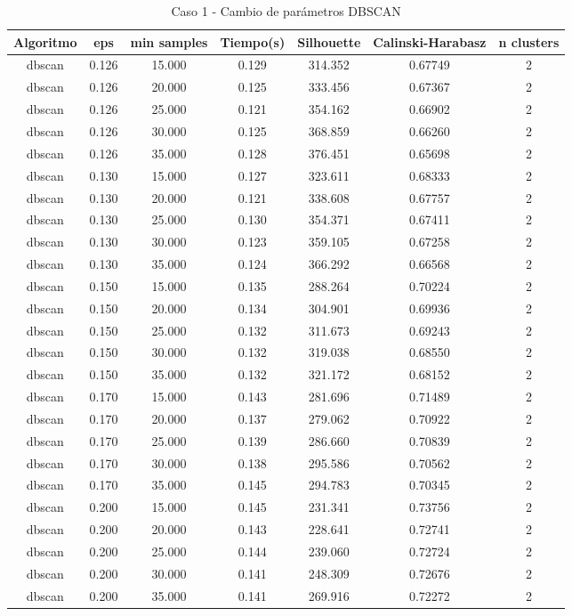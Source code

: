 \begin{table}[H]
\centering
\caption{Caso 1 - Cambio de parámetros DBSCAN}
\label{tab:c1_dbscan}
\begin{tabular}{ccccccc}
\toprule
Algoritmo & eps & min samples & Tiempo(s) & Silhouette & Calinski-Harabasz & n clusters \\
\midrule
dbscan & 0.126 & 15.000 & 0.129 & 314.352 & 0.67749 & 2 \\
dbscan & 0.126 & 20.000 & 0.125 & 333.456 & 0.67367 & 2 \\
dbscan & 0.126 & 25.000 & 0.121 & 354.162 & 0.66902 & 2 \\
dbscan & 0.126 & 30.000 & 0.125 & 368.859 & 0.66260 & 2 \\
dbscan & 0.126 & 35.000 & 0.128 & 376.451 & 0.65698 & 2 \\
dbscan & 0.130 & 15.000 & 0.127 & 323.611 & 0.68333 & 2 \\
dbscan & 0.130 & 20.000 & 0.121 & 338.608 & 0.67757 & 2 \\
dbscan & 0.130 & 25.000 & 0.130 & 354.371 & 0.67411 & 2 \\
dbscan & 0.130 & 30.000 & 0.123 & 359.105 & 0.67258 & 2 \\
dbscan & 0.130 & 35.000 & 0.124 & 366.292 & 0.66568 & 2 \\
dbscan & 0.150 & 15.000 & 0.135 & 288.264 & 0.70224 & 2 \\
dbscan & 0.150 & 20.000 & 0.134 & 304.901 & 0.69936 & 2 \\
dbscan & 0.150 & 25.000 & 0.132 & 311.673 & 0.69243 & 2 \\
dbscan & 0.150 & 30.000 & 0.132 & 319.038 & 0.68550 & 2 \\
dbscan & 0.150 & 35.000 & 0.132 & 321.172 & 0.68152 & 2 \\
dbscan & 0.170 & 15.000 & 0.143 & 281.696 & 0.71489 & 2 \\
dbscan & 0.170 & 20.000 & 0.137 & 279.062 & 0.70922 & 2 \\
dbscan & 0.170 & 25.000 & 0.139 & 286.660 & 0.70839 & 2 \\
dbscan & 0.170 & 30.000 & 0.138 & 295.586 & 0.70562 & 2 \\
dbscan & 0.170 & 35.000 & 0.145 & 294.783 & 0.70345 & 2 \\
dbscan & 0.200 & 15.000 & 0.145 & 231.341 & 0.73756 & 2 \\
dbscan & 0.200 & 20.000 & 0.143 & 228.641 & 0.72741 & 2 \\
dbscan & 0.200 & 25.000 & 0.144 & 239.060 & 0.72724 & 2 \\
dbscan & 0.200 & 30.000 & 0.141 & 248.309 & 0.72676 & 2 \\
dbscan & 0.200 & 35.000 & 0.141 & 269.916 & 0.72272 & 2 \\
\bottomrule
\end{tabular}
\end{table}

